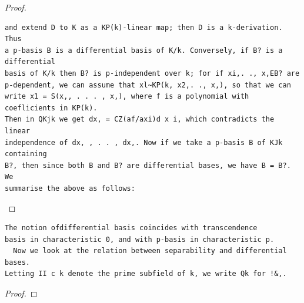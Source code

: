 \begin{proof}
\begin{verbatim}
and extend D to K as a KP(k)-linear map; then D is a k-derivation. Thus
a p-basis B is a differential basis of K/k. Conversely, if B? is a differential
basis of K/k then B? is p-independent over k; for if xi,. ., x,EB? are
p-dependent, we can assume that xl~KP(k, x2,. ., x,), so that we can
write x1 = S(x,, . . . , x,), where f is a polynomial with coeflicients in KP(k).
Then in QKjk we get dx, = CZ(af/axi)d x i, which contradicts the linear
independence of dx, , . . , dx,. Now if we take a p-basis B of KJk containing
B?, then since both B and B? are differential bases, we have B = B?. We
summarise the above as follows:
\end{verbatim}
\end{proof}


\begin{theorem}\label{mcrt-auto-theorem-26-5}\uses{}
\begin{verbatim}
The notion ofdifferential basis coincides with transcendence
basis in characteristic 0, and with p-basis in characteristic p.
  Now we look at the relation between separability and differential bases.
Letting II c k denote the prime subfield of k, we write Qk for !&,.
\end{verbatim}
\end{theorem}
\begin{proof}
\notready
\end{proof}


